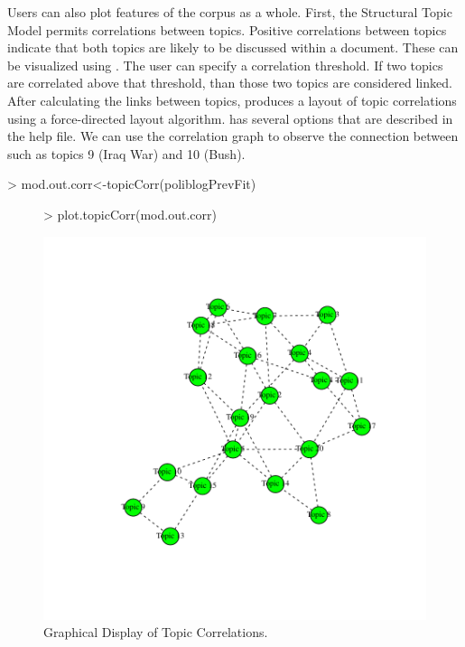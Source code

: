 \documentclass[nojss]{jss}
\begin{document}
Users can also plot features of the corpus as a whole. First, the Structural Topic Model permits correlations between topics. Positive correlations between topics indicate that both topics are likely to be discussed within a document. These can be visualized using . The user can specify a correlation threshold.  If two topics are correlated above that threshold, than those two topics are considered linked.  After calculating the links between topics,  produces a layout of topic correlations using a force-directed layout algorithm.  has several options that are described in the help file. We can use the correlation graph to observe the connection between such as topics 9 (Iraq War) and 10 (Bush).

\begin{Schunk}
\begin{Sinput}
> mod.out.corr<-topicCorr(poliblogPrevFit)
\end{Sinput}
\end{Schunk}

\begin{figure}
\begin{center}
\begin{Schunk}
\begin{Sinput}
> plot.topicCorr(mod.out.corr)
\end{Sinput}
\end{Schunk}
\includegraphics{stmVignette-025}
\caption{Graphical Display of Topic Correlations.}
\label{fig:correlations}
\end{center}
\end{figure}
\end{document}
